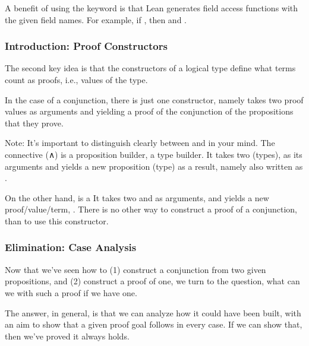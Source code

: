 \documentclass[letterpaper,10pt,english]{sphinxmanual}
\begin{document}
\sphinxAtStartPar
A benefit of using the  keyword is that Lean generates
field access functions with the given field names. For example, if
, then  and .


\subsubsection{Introduction: Proof Constructors}
\label{\detokenize{A_02_Constructive_Logic:introduction-proof-constructors}}
\sphinxAtStartPar
The second key idea is that the constructors of a logical type
define what terms count as proofs, i.e., values of the type.

\sphinxAtStartPar
In the case of a conjunction, there is just one constructor,
namely  takes two proof values as arguments and yielding
a proof of the conjunction of the propositions that they prove.

\sphinxAtStartPar
Note: It’s important to distinguish clearly between  and
 in your mind. The  connective (∧) is a proposition
builder, a type builder. It takes two  (types),
 as its arguments and yields a new proposition
(type) as a result, namely  also written as .

\sphinxAtStartPar
On the other hand,  is a 
It takes two  and  as arguments,
and yields a new proof/value/term, . There is
no other way to construct a proof of a conjunction,  than
to use this constructor.


\subsubsection{Elimination: Case Analysis}
\label{\detokenize{A_02_Constructive_Logic:elimination-case-analysis}}
\sphinxAtStartPar
Now that we’ve seen how to (1) construct a conjunction from two
given propositions, and (2) construct a proof of one, we turn to
the question, what can we  with such a proof if we have one.

\sphinxAtStartPar
The answer, in general, is that we can analyze how it could have
been built, with an aim to show that a given proof goal follows
in every case. If we can show that, then we’ve proved it always
holds.
\end{document}
